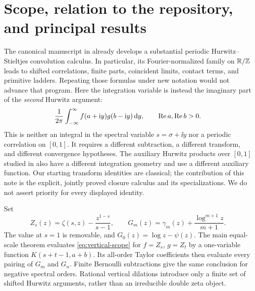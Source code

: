 \section{Scope, relation to the repository, and principal results}
\label{sec:scope}

The canonical manuscript in \cite{repo} already develops a substantial
periodic Hurwitz--Stieltjes convolution calculus. In particular, its
Fourier-normalized family on $\mathbb R/\mathbb Z$ leads to shifted correlations,
finite parts, coincident limits, contact terms, and primitive ladders.
Repeating those formulas under new notation would not advance that program.
Here the integration variable is instead the imaginary part of the
\emph{second} Hurwitz argument:
\begin{equation}\label{eq:vertical-scope}
 \frac1{2\pi}\int_{-\infty}^{\infty}
       f(a+\mathrm i y)g(b-\mathrm i y)\,\mathrm d y,
 \qquad \operatorname{Re} a,\operatorname{Re} b>0.
\end{equation}
This is neither an integral in the spectral variable $s=\sigma+\ii y$ nor
a periodic correlation on $[0,1]$. It requires a different subtraction,
a different transform, and different convergence hypotheses. The auxiliary
Hurwitz products over $[0,1]$ studied in \cite{shpot2016,shpot-paris} also
have a different integration geometry and use a different auxiliary
function. Our starting transform identities are classical; the contribution
of this note is the explicit, jointly proved closure calculus and its
specializations. We do not assert priority for every displayed identity.

Set
\begin{equation}\label{eq:Z-definition-intro}
 Z_s(z)=\zeta(s,z)-\frac{z^{1-s}}{s-1},
 \qquad
 G_m(z)=\gamma_m(z)+\frac{\log^{m+1}z}{m+1}.
\end{equation}
The value at $s=1$ is removable, and $G_0(z)=\log z-\psi(z)$.
The main equal-scale theorem evaluates \eqref{eq:vertical-scope} for
$f=Z_s$, $g=Z_t$ by a one-variable function $K(s+t-1,a+b)$.
Its all-order Taylor coefficients then evaluate every pairing of $G_m$
and $G_n$. Finite Bernoulli subtractions give the same conclusion for
negative spectral orders. Rational vertical dilations introduce only a
finite set of shifted Hurwitz arguments, rather than an irreducible double
zeta object.

